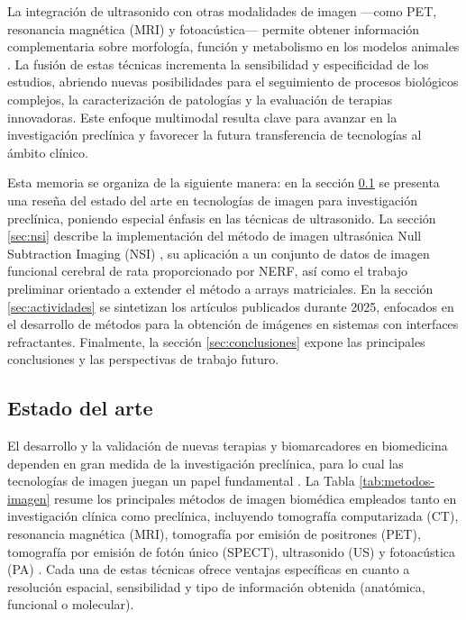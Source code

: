 \documentclass[10pt,a4paper]{article}
\begin{document}
La integración de ultrasonido con otras modalidades de imagen —como PET, resonancia magnética (MRI) y fotoacústica— permite obtener información complementaria sobre morfología, función y metabolismo en los modelos animales \cite{Wu2018, Rovera2025}. La fusión de estas técnicas incrementa la sensibilidad y especificidad de los estudios, abriendo nuevas posibilidades para el seguimiento de procesos biológicos complejos, la caracterización de patologías y la evaluación de terapias innovadoras. Este enfoque multimodal resulta clave para avanzar en la investigación preclínica y favorecer la futura transferencia de tecnologías al ámbito clínico.

Esta memoria se organiza de la siguiente manera: en la sección \ref{sec:estado_arte} se presenta una reseña del estado del arte en tecnologías de imagen para investigación preclínica, poniendo especial énfasis en las técnicas de ultrasonido. La sección \ref{sec:nsi} describe la implementación del método de imagen ultrasónica Null Subtraction Imaging (NSI) \cite{Agarwal2019_NSI}, su aplicación a un conjunto de datos de imagen funcional cerebral de rata proporcionado por NERF, así como el trabajo preliminar orientado a extender el método a arrays matriciales. En la sección \ref{sec:actividades} se sintetizan los artículos publicados durante 2025, enfocados en el desarrollo de métodos para la obtención de imágenes en sistemas con interfaces refractantes. Finalmente, la sección \ref{sec:conclusiones} expone las principales conclusiones y las perspectivas de trabajo futuro.


\subsection{Estado del arte}\label{sec:estado_arte}

El desarrollo y la validación de nuevas terapias y biomarcadores en biomedicina dependen en gran medida de la investigación preclínica, para lo cual las tecnologías de imagen juegan un papel fundamental \cite{Rovera2025}. La Tabla \ref{tab:metodos-imagen} resume los principales métodos de imagen biomédica empleados tanto en investigación clínica como preclínica, incluyendo tomografía computarizada (CT), resonancia magnética (MRI), tomografía por emisión de positrones (PET), tomografía por emisión de fotón único (SPECT), ultrasonido (US) y fotoacústica (PA) \cite{Bushberg2021}. Cada una de estas técnicas ofrece ventajas específicas en cuanto a resolución espacial, sensibilidad y tipo de información obtenida (anatómica, funcional o molecular).
\end{document}
